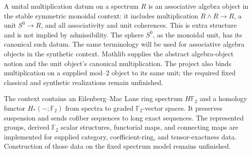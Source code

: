 \begin{definition}
  \label{def:unital-multiplication-data}
  \notready
  A unital multiplication datum on a spectrum $R$ is an associative algebra
  object in the stable symmetric monoidal context: it includes multiplication
  $R\wedge R\to R$, a unit $S^0\to R$, and all associativity and unit
  coherences.  This is extra structure and is not implied by admissibility.
  The sphere $S^0$, as the monoidal unit, has its canonical such datum.  The
  same terminology will be used for associative algebra objects in the
  synthetic context.
  Mathlib supplies the abstract algebra-object notion and the unit object's
  canonical multiplication. The project also binds multiplication on a
  supplied mod--$2$ object to its same unit; the required fixed classical
  and synthetic realizations remain unfinished.
\end{definition}

\begin{definition}
  \label{def:hf2-homology}
  \notready
  The context contains an Eilenberg--Mac Lane ring spectrum $H\mathbb F_2$ and
  a homology functor $H_*(-;\mathbb F_2)$ from spectra to graded
  $\mathbb F_2$-vector spaces.  It preserves suspension and sends cofiber
  sequences to long exact sequences.
  The represented groups, derived $\mathbb F_2$ scalar structures,
  functorial maps, and connecting maps are implemented for supplied category,
  coefficient-ring, and tensor-exactness data. Construction of those data
  on the fixed spectrum model remains unfinished.
\end{definition}

